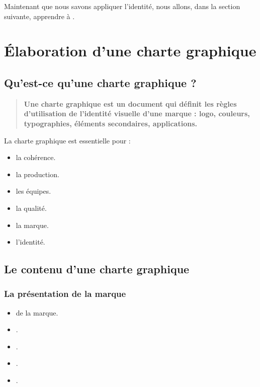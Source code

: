 Maintenant que nous savons appliquer l'identité, nous allons, dans la section suivante, apprendre à .

\section{Élaboration d'une charte graphique}

\subsection{Qu'est-ce qu'une charte graphique ?}

\begin{quote}
\textbf{Une charte graphique est un document qui définit les règles d'utilisation de l'identité visuelle d'une marque : logo, couleurs, typographies, éléments secondaires, applications.}
\end{quote}

La charte graphique est essentielle pour :

\begin{itemize}
    \item {} la cohérence.
    \item {} la production.
    \item {} les équipes.
    \item {} la qualité.
    \item {} la marque.
    \item {} l'identité.
\end{itemize}

\subsection{Le contenu d'une charte graphique}

\subsubsection{La présentation de la marque}

\begin{itemize}
    \item {} de la marque.
    \item {}.
    \item {}.
    \item {}.
    \item {}.
\end{itemize}

